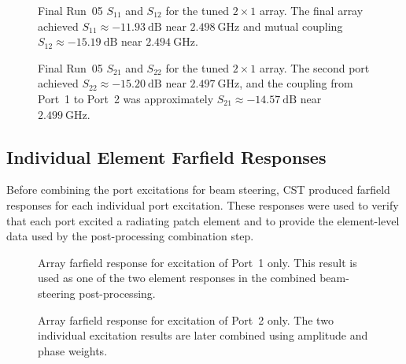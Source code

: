 \begin{figure}[H]
    \centering
    \caption{Final Run~05 \(S_{11}\) and \(S_{12}\) for the tuned \(2\times1\) array.  The final array achieved \(S_{11}\approx -11.93~\mathrm{dB}\) near \(2.498~\mathrm{GHz}\) and mutual coupling \(S_{12}\approx -15.19~\mathrm{dB}\) near \(2.494~\mathrm{GHz}\).}
    \label{fig:array-s11-s12}
\end{figure}

\begin{figure}[H]
    \centering
    \caption{Final Run~05 \(S_{21}\) and \(S_{22}\) for the tuned \(2\times1\) array.  The second port achieved \(S_{22}\approx -15.20~\mathrm{dB}\) near \(2.497~\mathrm{GHz}\), and the coupling from Port~1 to Port~2 was approximately \(S_{21}\approx -14.57~\mathrm{dB}\) near \(2.499~\mathrm{GHz}\).}
    \label{fig:array-s21-s22}
\end{figure}

\subsection{Individual Element Farfield Responses}

Before combining the port excitations for beam steering, CST produced farfield responses for each
individual port excitation.  These responses were used to verify that each port excited a radiating patch
element and to provide the element-level data used by the post-processing combination step.

\begin{figure}[H]
    \centering
    \caption{Array farfield response for excitation of Port~1 only.  This result is used as one of the two element responses in the combined beam-steering post-processing.}
    \label{fig:array-ff-excitation1}
\end{figure}

\begin{figure}[H]
    \centering
    \caption{Array farfield response for excitation of Port~2 only.  The two individual excitation results are later combined using amplitude and phase weights.}
    \label{fig:array-ff-excitation2}
\end{figure}

